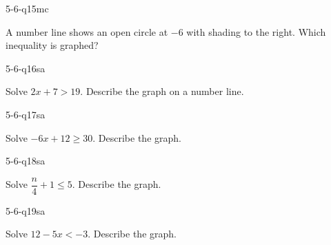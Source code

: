 \begin{practiceQuestion}{5-6-q15}{mc}
\begin{questionText}
A number line shows an open circle at $-6$ with shading to the right. Which inequality is graphed?
\end{questionText}
\end{practiceQuestion}


\begin{practiceQuestion}{5-6-q16}{sa}
\begin{questionText}
Solve $2x + 7 > 19$. Describe the graph on a number line.
\end{questionText}
\end{practiceQuestion}

\begin{practiceQuestion}{5-6-q17}{sa}
\begin{questionText}
Solve $-6x + 12 \geq 30$. Describe the graph.
\end{questionText}
\end{practiceQuestion}

\begin{practiceQuestion}{5-6-q18}{sa}
\begin{questionText}
Solve $\dfrac{n}{4} + 1 \leq 5$. Describe the graph.
\end{questionText}
\end{practiceQuestion}

\begin{practiceQuestion}{5-6-q19}{sa}
\begin{questionText}
Solve $12 - 5x < -3$. Describe the graph.
\end{questionText}
\end{practiceQuestion}

